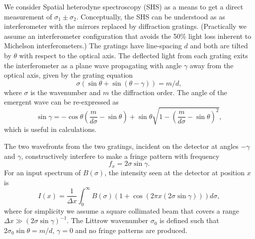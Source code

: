 \documentclass[preprint]{aastex}
\begin{document}
We consider Spatial heterodyne spectroscopy (SHS) \citep{1990SPIE.1235..622H}
as a means to get a direct measurement of  $\sigma_1\pm\sigma_2$.
Conceptually, the SHS can be understood as as interferometer with the  mirrors replaced by diffraction gratings.
(Practically we assume an interferometer configuration that  avoids the 50\% light loss inherent to  Michelson interferometers.)
The gratings have line-spacing $d$ and both are tilted
by $\theta$ with respect to the optical axis.  The deflected light from each grating exits the interferometer as a plane wave
propagating with angle $\gamma$ away from the optical axis,  given by the grating equation
\begin{equation}
\sigma\left(\sin{\theta}+\sin{\left(\theta-\gamma\right)}\right)=m/d,
\end{equation}
where $\sigma$ is the wavenumber and $m$ the diffraction order.
The angle of the emergent wave can be re-expressed as
\begin{equation}
\sin{\gamma}=-\cos{\theta} \left(\frac{m}{d\sigma} - \sin{\theta} \right)+ \sin{\theta}\sqrt{1-\left(\frac{m}{d\sigma} -\sin{\theta} \right)^2},
\end{equation}
which is useful in calculations.

The two wavefronts from the two gratings, incident on the detector at angles $-\gamma$ and $\gamma$, constructively interfere to make a fringe
pattern with  frequency
\begin{equation}
f_x=2\sigma\sin{\gamma}.
\end{equation}
For an input spectrum of $B(\sigma)$, the intensity seen at the detector at position $x$ is
\begin{equation}
I(x)=\frac{1}{\Delta x}\int_{0}^{\infty} B(\sigma)\left(1+\cos{\left(2 \pi x (2\sigma \sin{\gamma})\right)}\right)d\sigma,
\end{equation}
where for simplicity we assume a square collimated beam that covers
a range  $\Delta x \gg \left(2\sigma \sin{\gamma}\right)^{-1}$.
The Littrow wavenumber $\sigma_0$ is defined such that $2\sigma_0\sin{\theta}=m/d$, $\gamma=0$ and no fringe patterns are produced.
\end{document}
